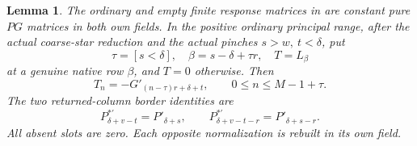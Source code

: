 \documentclass[11pt,a4paper]{amsart}
\numberwithin{equation}{section}
\theoremstyle{plain}
\newtheorem{lemma}[theorem]{Lemma}
\theoremstyle{definition}
\begin{document}
\begin{lemma}\label{ph:gradient}
The ordinary and empty finite response matrices in
 are constant pure \(PG\) matrices in both own
fields.  In the positive ordinary principal range, after the actual
coarse-star reduction and the actual pinches \(s>w,\ t<\delta\), put
\[
 \tau=[s<\delta],\quad \beta=s-\delta+\tau r,\quad
 T=L_\beta
\]
at a genuine native row \(\beta\), and \(T=0\) otherwise.  Then
\begin{equation}\label{ph:row-value}
 T_n=-G'_{(n-\tau)r+\delta+t},\qquad 0\le n\le M-1+\tau.
\end{equation}
The two returned-column border identities are
\begin{equation}\label{ph:P-borders}
 P^{*'}_{\delta+v-t}=P'_{\delta+s},\qquad
 P^{*'}_{\delta+v-t-r}=P'_{\delta+s-r}.
\end{equation}
All absent slots are zero.  Each opposite normalization is rebuilt in
its own field.
\end{lemma}
\end{document}
